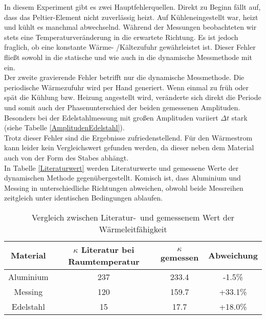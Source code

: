In diesem Experiment gibt es zwei Hauptfehlerquellen. Direkt zu Beginn fällt auf, dass das Peltier-Element nicht zuverlässig heizt. Auf \glqq Kühlen\grqq ein\-ge\-stel\-lt war, heizt und kühlt es manchmal abwechselnd. Während der Messungen beobachteten wir stets eine Temperaturveränderung in die erwartete Richtung. Es ist jedoch fraglich, ob eine konstante Wärme- /Kältezufuhr gewährleistet ist. Dieser Fehler fließt sowohl in die statische und wie auch in die dynamische Messmethode mit ein. \\
Der zweite gravierende Fehler betrifft nur die dynamische Messmethode. Die periodische Wärmezufuhr wird per Hand generiert. Wenn einmal zu früh oder spät die Kühlung bzw. Heizung angestellt wird, veränderte sich direkt die Periode und somit auch der Phasenunterschied der beiden gemessenen Amplituden. Besonders bei der Edelstahlmessung mit großen Amplituden variiert $\Delta t$ stark (siehe Tabelle \ref{AmplitudenEdelstahl}). \\
Trotz dieser Fehler sind die Ergebnisse zufriedenstellend. 
Für den Wärmestrom kann leider kein Vergleichswert gefunden werden, da dieser neben dem Material auch von der Form des Stabes abhängt. \\ 
In Tabelle \ref{Literaturwert} werden Literaturwerte und gemessene Werte der dynamischen Methode gegenübergestellt. Komisch ist, dass Aluminium und Messing in unterschiedliche Richtungen abweichen, obwohl beide Messreihen zeitgleich unter identischen Bedingungen ablaufen.


\begin{table}[h!]
\begin{center}
\begin{tabular}{c|c|c|c}
	Material & $\kappa$ Literatur bei Raumtemperatur & $\kappa$ gemessen & Abweichung \\
\hline
	Aluminium & 237 & 233.4 & -1.5\% \\
	Messing & 120 & 159.7 & +33.1\% \\
	Edelstahl & 15 & 17.7 & +18.0\%\\
\end{tabular}
\end{center}
\caption[Vergleich zwischen Literatur- und gemessenem Wert der Wärmeleitfähigkeit]{Vergleich zwischen Literatur-\footnotemark\ und gemessenem Wert der Wärmeleitfähigkeit}
\end{table}
